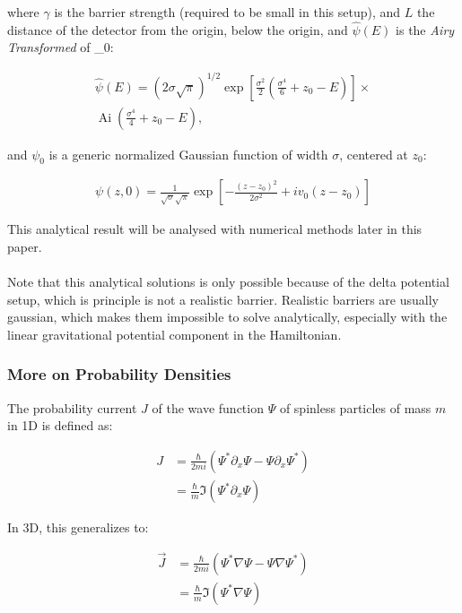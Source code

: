 where $\gamma$ is the barrier strength (required to be small in this setup), and $L$ the distance of the detector from the origin, below the origin, and  $\hat{\psi}(E)$ is the \textit{Airy Transformed} of \psi_0:

\begin{align}
\hat{\psi}(E) = \left( 2 \sigma \sqrt{\pi} \right)^{1/2} 
\exp \left[ \frac{\sigma^2}{2} \left( \frac{\sigma^4}{6} + z_0 - E \right) \right] 
\times \\ \operatorname{Ai} \left( \frac{\sigma^4}{4} + z_0 - E \right),
\end{align}

and $\psi_0$ is a generic normalized Gaussian function of width $\sigma$, centered at $z_0$:

\begin{align}
    \psi(z, 0) = \frac{1}{\sqrt{\sigma} \sqrt{\pi}} \exp \left[ -\frac{(z - z_0)^2}{2\sigma^2} + i v_0 (z - z_0) \right]
\end{align}

This analytical result will be analysed with numerical methods later in this paper.\\\\
Note that this analytical solutions is only possible because of the delta potential setup, which is principle is not a realistic barrier. Realistic barriers are usually gaussian, which makes them impossible to solve analytically, especially with the linear gravitational potential component in the Hamiltonian.

\subsubsection{More on Probability Densities}

The probability current $J$ of the wave function $\Psi$ of spinless particles of mass $m$ in 1D is defined as:

\begin{align}
J &= \frac{\hbar}{2mi} \left( \Psi^* \partial_x \Psi - \Psi \partial_x \Psi^*  \right) \\
&= \frac{\hbar}{m} \Im \left( 
\Psi^* \partial_x \Psi \right)
\end{align}

In 3D, this generalizes to:

\begin{align}
\vec{J} &= \frac{\hbar}{2mi} \left( \Psi^* \nabla \Psi - \Psi \nabla \Psi^*  \right) \\
    &= \frac{\hbar}{m} \Im \left( \Psi^* \nabla \Psi \right)
\end{align}

